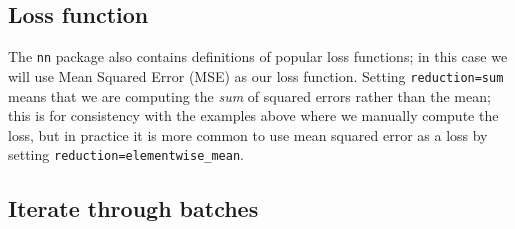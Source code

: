 \documentclass[]{book}
\newenvironment{Shaded}{\begin{snugshade}}{\end{snugshade}}
\newcommand{\DataTypeTok}[1]{\textcolor[rgb]{0.13,0.29,0.53}{#1}}
\newcommand{\KeywordTok}[1]{\textcolor[rgb]{0.13,0.29,0.53}{\textbf{#1}}}
\newcommand{\NormalTok}[1]{#1}
\newcommand{\OperatorTok}[1]{\textcolor[rgb]{0.81,0.36,0.00}{\textbf{#1}}}
\newcommand{\StringTok}[1]{\textcolor[rgb]{0.31,0.60,0.02}{#1}}
\begin{document}
\hypertarget{loss-function-1}{%
\subsection{Loss function}\label{loss-function-1}}

The \texttt{nn} package also contains definitions of popular loss functions; in this case we will use Mean Squared Error (MSE) as our loss function. Setting \texttt{reduction=\textquotesingle{}sum\textquotesingle{}} means that we are computing the \emph{sum} of squared errors rather than the mean; this is for consistency with the examples above where we manually compute the loss, but in practice it is more common to use mean squared error as a loss by setting \texttt{reduction=\textquotesingle{}elementwise\_mean\textquotesingle{}}.

\begin{Shaded}
\end{Shaded}

\hypertarget{iterate-through-batches}{%
\subsection{Iterate through batches}\label{iterate-through-batches}}
\end{document}
